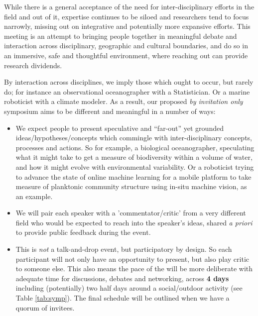While there is a general acceptance of the need for inter-disciplinary
efforts in the field and out of it, expertise continues to be siloed
and researchers tend to focus narrowly, missing out on integrative and
potentially more expansive efforts. This meeting is an attempt to
bringing people together in meaningful debate and interaction across
disciplinary, geographic and cultural boundaries, and do so in an
immersive, safe and thoughtful environment, where reaching out can
provide research dividends.

By interaction across disciplines, we imply those which ought to
occur, but rarely do; for instance an observational oceanographer with
a Statistician. Or a marine roboticist with a climate modeler. As a
result, our proposed \emph{by invitation only} symposium aims to be
different and meaningful in a number of ways:

\begin{itemize}

\item We expect people to present speculative and ``far-out'' yet
  grounded ideas/hypotheses/concepts which commingle with
  inter-disciplinary concepts, processes and actions. So for example,
  a biological oceanographer, speculating what it might take to get a
  measure of biodiversity within a volume of water, and how it might
  evolve with environmental variability. Or a roboticist trying to
  advance the state of online machine learning for a mobile platform
  to take measure of planktonic community structure using in-situ
  machine vision, as an example. 

\item We will pair each speaker with a 'commentator/critic' from a
  very different field who would be expected to reach into the
  speaker's ideas, shared \emph{a priori} to provide public feedback
  during the event. 

\item This is \emph{not} a talk-and-drop event, but participatory by
  design. So each participant will not only have an opportunity to
  present, but also play critic to someone else. This also means the
  pace of the \symp will be more deliberate with adequate time for
  discussions, debates and networking, across \textbf{4 days}
  including (potentially) two half days around a social/outdoor
  activity (see Table \ref{tab:symp}). The final schedule will be
  outlined when we have a quorum of invitees.

\end{itemize}  

